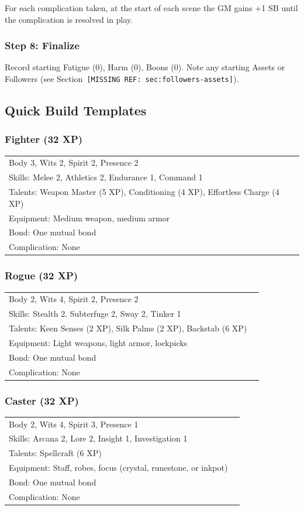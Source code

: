 For each complication taken, at the start of each scene the GM gains +1 SB until the complication is resolved in play.

\subsubsection{Step 8: Finalize}
Record starting Fatigue (0), Harm (0), Boons (0). Note any starting Assets or Followers (see Section~\texttt{[MISSING REF: sec:followers-assets]}).

\subsection{Quick Build Templates}

\subsubsection{Fighter (32 XP)}
\begin{tabular}{@{}ll@{}}
Body 3, Wits 2, Spirit 2, Presence 2 \\
Skills: Melee 2, Athletics 2, Endurance 1, Command 1 \\
Talents: Weapon Master (5 XP), Conditioning (4 XP), Effortless Charge (4 XP) \\
Equipment: Medium weapon, medium armor \\
Bond: One mutual bond \\
Complication: None \\
\end{tabular}

\subsubsection{Rogue (32 XP)}
\begin{tabular}{@{}ll@{}}
Body 2, Wits 4, Spirit 2, Presence 2 \\
Skills: Stealth 2, Subterfuge 2, Sway 2, Tinker 1 \\
Talents: Keen Senses (2 XP), Silk Palms (2 XP), Backstab (6 XP) \\
Equipment: Light weapons, light armor, lockpicks \\
Bond: One mutual bond \\
Complication: None \\
\end{tabular}

\subsubsection{Caster (32 XP)}
\begin{tabular}{@{}ll@{}}
Body 2, Wits 4, Spirit 3, Presence 1 \\
Skills: Arcana 2, Lore 2, Insight 1, Investigation 1 \\
Talents: Spellcraft (6 XP) \\
Equipment: Staff, robes, focus (crystal, runestone, or inkpot) \\
Bond: One mutual bond \\
Complication: None \\
\end{tabular}

